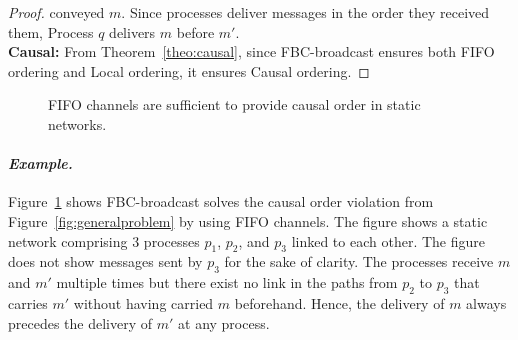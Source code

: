 \begin{proof}
  conveyed $m$. Since processes deliver messages in the order they received
  them, Process $q$ delivers $m$ before $m'$. \\
  \textbf{Causal:} From Theorem~\ref{theo:causal}, since FBC-broadcast ensures
  both FIFO ordering and Local ordering, it ensures Causal ordering.
\end{proof}


\begin{figure}
  \begin{center}
    
    \caption{\label{fig:static}FIFO channels are sufficient to provide causal
      order in static networks.}
  \end{center}
\end{figure}

\paragraph{\emph{Example.}} Figure~\ref{fig:static} shows FBC-broadcast solves
the causal order violation from Figure~\ref{fig:generalproblem} by using FIFO
channels.  The figure shows a static network comprising 3 processes $p_1$,
$p_2$, and $p_3$ linked to each other. The figure does not show messages sent by
$p_3$ for the sake of clarity.  The processes receive $m$ and $m'$ multiple
times but there exist no link in the paths from $p_2$ to $p_3$ that carries $m'$
without having carried $m$ beforehand. Hence, the delivery of $m$ always
precedes the delivery of $m'$ at any process.


